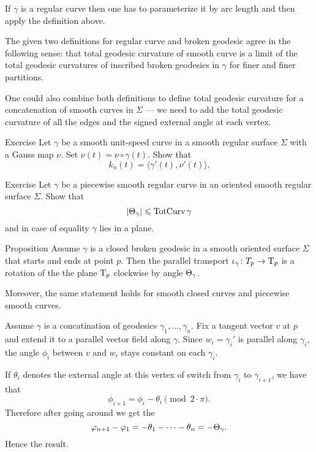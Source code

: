 If $\gamma$ is a regular curve then one has to parameterize it by arc length and then apply the definition above.

The given two definitions for regular curve and broken geodesic agree in the following sense: that total geodesic curvature of smooth curve is a limit of the total geodesic curvatures of inscribed broken geodesics in $\gamma$ for finer and finer partitions.

One could also combine both definitions to define total geodesic curvature for a concatenation of smooth curves in $\Sigma$ --- we need to add the total geodesic curvature of all the edges and the signed external angle at each vertex. 

\begin{thm}{Exercise}
Let $\gamma$ be a smooth unit-speed curve in a  smooth regular surface $\Sigma$ with a Gauss map $\nu$.
Set $\nu(t)=\nu\circ\gamma(t)$.
Show that 
\[k_n(t)=\langle\gamma'(t),\nu'(t)\rangle.\]

\end{thm}

\begin{thm}{Exercise}
Let $\gamma$ be a piecewise smooth regular curve in an oriented smooth regular surface $\Sigma$.
Show that 
\[|\Theta_{\gamma}|\leqslant \mathop{\rm TotCurv}\nolimits\gamma\]
and in case of equality $\gamma$ lies in a plane.
\end{thm}



\begin{thm}{Proposition}\label{prop:pt+tgc}
Assume $\gamma$ is a closed broken geodesic in a smooth oriented surface $\Sigma$ that starts and ends at point $p$.
Then the parallel transport $\iota_\gamma\colon T_p\to\mathrm{T}_p$ is a rotation of the the plane $\mathrm{T}_p$ clockwise by angle $\Theta_{\gamma}$.

Moreover, the same statement holds for smooth closed curves and piecewise smooth curves.
\end{thm}

Assume $\gamma$ is a concatination of geodesics $\gamma_1,\dots,\gamma_n$.
Fix a tangent vector $v$ at $p$ and extend it to a parallel vector field along $\gamma$.
Since $w_i=\gamma_i'$ is parallel along $\gamma_i$, the angle $\phi_i$ between $v$ and $w_i$ stays constant on each $\gamma_i$.

If $\theta_i$ denotes the external angle at this vertex of switch from $\gamma_{i}$ to $\gamma_{i+1}$, we have that 
\[\phi_{i+1}=\phi_i-\theta_i \pmod{2\cdot\pi}.\]
Therefore after going around we get the 
\[\varphi_{n+1}-\varphi_1=-\theta_1-\dots-\theta_n=-\Theta_{\gamma}.\]
Hence the result.


